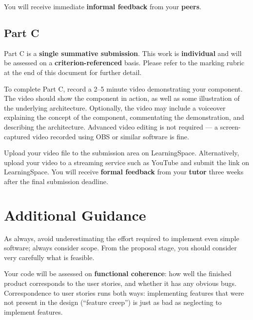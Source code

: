 \documentclass{../../fal_assignment}
\begin{document}
You will receive immediate \textbf{informal feedback} from your \textbf{peers}.

\subsection*{Part C}

Part C is a \textbf{single summative submission}. This work is \textbf{individual} and will be assessed on a \textbf{criterion-referenced} basis. Please refer to the marking rubric at the end of this document for further detail.

To complete Part C, record a 2--5 minute video demonstrating your component.
The video should show the component in action, as well as some illustration of the underlying architecture.
Optionally, the video may include a voiceover explaining the concept of the component,
commentating the demonstration, and describing the architecture.
Advanced video editing is not required --- a screen-captured video recorded using OBS or similar software is fine.

Upload your video file to the submission area on LearningSpace. 
Alternatively, upload your video to a streaming service such as YouTube and submit the link on LearningSpace.
You will receive \textbf{formal feedback} from your \textbf{tutor} three weeks after the final submission deadline.

\section*{Additional Guidance}

As always, avoid underestimating the effort required to implement even simple software; always consider scope.
From the proposal stage, you should consider very carefully what is feasible.

Your code will be assessed on \textbf{functional coherence}:
how well the finished product corresponds to the user stories,
and whether it has any obvious bugs.
Correspondence to user stories runs both ways:
implementing features that were not present in the design (``feature creep'')
is just as bad as neglecting to implement features.

\end{document}
